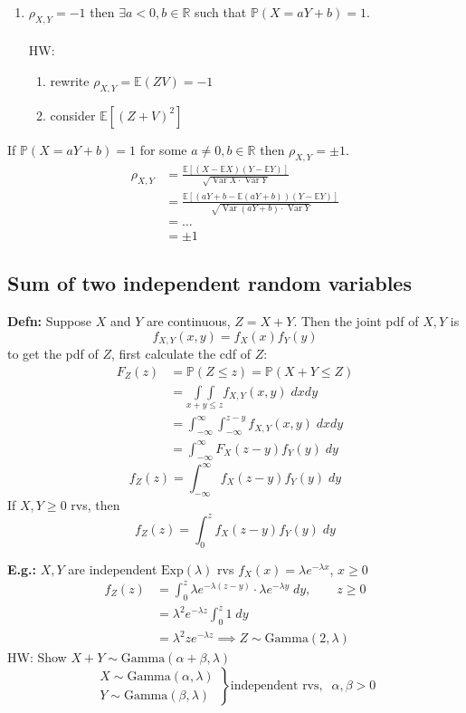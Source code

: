 \documentclass[a4paper]{article}
\newcommand{\n}{\hfill\break}
\newcommand{\defn}[1]{\par\noindent\settowidth{\hangindent}{\textbf{Defn: }}\textbf{Defn: }#1\n}
\newcommand{\eg}[1]{\par\noindent\settowidth{\hangindent}{\textbf{E.g.: }}\textbf{E.g.: }#1\n}
\newcommand{\reals}{\mathbb{R}}
\newcommand{\R}{\reals}
\newcommand{\Prob}{\mathbb{P}}
\renewcommand{\P}{\Prob}
\newcommand{\Avg}{\mathbb{E}}
\newcommand{\E}{\Avg}
\DeclareMathOperator{\Var}{Var}
\begin{document}
{\begin{enumerate}
        \item  $\rho_{X,Y}=-1$ then $\exists a<0, b\in\R$ such that $\P(X=aY+b)=1$. \\\\
        HW:
        \begin{enumerate}
            \item rewrite $\rho_{X,Y}=\E(ZV)=-1$
            \item consider $\E[(Z+V)^2]$
        \end{enumerate}
    \end{enumerate}
    If $\P(X=aY+b)=1$ for some $a\neq0,b\in\R$ then $\rho_{X,Y}=\pm1$.
    \begin{align*}
        \rho_{X,Y}&=\frac{\E[(X-\E X)(Y-\E Y)]}{\sqrt{\Var X\cdot\Var Y}} \\
        &=\frac{\E[(aY+b-\E(aY+b))(Y-\E Y)]}{\sqrt{\Var(aY+b)\cdot\Var Y}} \\
        &=\dots \\
        &=\pm1
    \end{align*}
}

\subsection*{Sum of two independent random variables}

\defn{
    Suppose $X$ and $Y$ are continuous, $Z=X+Y$. Then the joint pdf of $X,Y$ is
    \[f_{X,Y}(x,y)=f_X(x)f_Y(y)\]
    to get the pdf of $Z$, first calculate the cdf of $Z$:
    \begin{align*}
        F_Z(z)&=\P(Z\leq z)=\P(X+Y\leq Z) \\
        &=\underset{x+y\leq z}{\int\int}f_{X,Y}(x,y)\;dxdy \\
        &=\int_{-\infty}^\infty\int_{-\infty}^{z-y} f_{X,Y}(x,y)\;dxdy \\
        &=\int_{-\infty}^\infty F_X(z-y)f_Y(y)\;dy
    \end{align*}
    \[f_Z(z)=\int_{-\infty}^\infty f_X(z-y)f_Y(y)\;dy\]
    If $X,Y\geq0$ rvs, then
     \[f_Z(z)=\int_0^z f_X(z-y)f_Y(y)\;dy\]
}

\eg{
    $X,Y$ are independent $\text{Exp}(\lambda)$ rvs $f_X(x)=\lambda e^{-\lambda x}$, $x\geq0$
    \begin{align*}
        f_Z(z)&=\int^z_0\lambda e^{-\lambda(z-y)}\cdot\lambda e^{-\lambda y}\;dy,\qquad z\geq0 \\
        &=\lambda^2e^{-\lambda z}\int^z_0 1\;dy \\
        &=\lambda^2ze^{-\lambda z} \implies Z\sim\text{Gamma}(2,\lambda)
    \end{align*}
    HW: Show $X+Y\sim\text{Gamma}(\alpha+\beta,\lambda)$
    \[\left.\begin{array}{c}
        X\sim\text{Gamma}(\alpha,\lambda)  \\
        Y\sim\text{Gamma}(\beta,\lambda)
    \end{array}\right\}\text{independent rvs},\;\;\alpha,\beta>0\]
}
\end{document}

